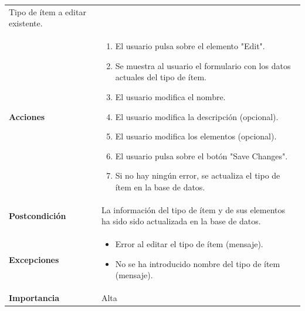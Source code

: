 \documentclass[
]{article}
\providecommand{\tightlist}{%
  \setlength{\itemsep}{0pt}\setlength{\parskip}{0pt}}
\begin{document}
\begin{longtable}[]{@{}ll@{}}
\begin{minipage}[t]{0.75\columnwidth}
Tipo de ítem a editar existente.\strut
\end{minipage}\tabularnewline
\begin{minipage}[t]{0.20\columnwidth}\raggedright
\textbf{Acciones}\strut
\end{minipage} & \begin{minipage}[t]{0.75\columnwidth}\raggedright
\begin{enumerate}
\def\labelenumi{\arabic{enumi}.}
\tightlist
\item
  El usuario pulsa sobre el elemento "Edit".
\item
  Se muestra al usuario el formulario con los datos actuales del tipo de
  ítem.
\item
  El usuario modifica el nombre.
\item
  El usuario modifica la descripción (opcional).
\item
  El usuario modifica los elementos (opcional).
\item
  El usuario pulsa sobre el botón "Save Changes".
\item
  Si no hay ningún error, se actualiza el tipo de ítem en la base de
  datos.
\end{enumerate}\strut
\end{minipage}\tabularnewline
\begin{minipage}[t]{0.20\columnwidth}\raggedright
\textbf{Postcondición}\strut
\end{minipage} & \begin{minipage}[t]{0.75\columnwidth}\raggedright
La información del tipo de ítem y de sus elementos ha sido sido
actualizada en la base de datos.\strut
\end{minipage}\tabularnewline
\begin{minipage}[t]{0.20\columnwidth}\raggedright
\textbf{Excepciones}\strut
\end{minipage} & \begin{minipage}[t]{0.75\columnwidth}\raggedright
\begin{itemize}
\tightlist
\item
  Error al editar el tipo de ítem (mensaje).
\item
  No se ha introducido nombre del tipo de ítem (mensaje).
\end{itemize}\strut
\end{minipage}\tabularnewline
\begin{minipage}[t]{0.20\columnwidth}\raggedright
\textbf{Importancia}\strut
\end{minipage} & \begin{minipage}[t]{0.75\columnwidth}\raggedright
Alta\strut
\end{minipage}\tabularnewline
\bottomrule
\end{longtable}
\end{document}
